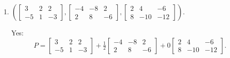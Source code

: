\begin{enumerate}[label=\alph*)]
\item $\left(\begin{bmatrix}3&2&2\\-5&1&-3\end{bmatrix},\begin{bmatrix}-4&-8&2\\2&8&-6\end{bmatrix},\begin{bmatrix}2&4&-6\\8&-10&-12\end{bmatrix}\right)$.

\begin{answer}
Yes:
\[
 P=\begin{bmatrix}3&2&2\\-5&1&-3\end{bmatrix}
 +\tfrac12\begin{bmatrix}-4&-8&2\\2&8&-6\end{bmatrix}
 +0\begin{bmatrix}2&4&-6\\8&-10&-12\end{bmatrix}.
\]
\end{answer}
\end{enumerate}

